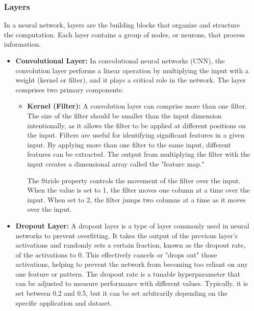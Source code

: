 \subsubsection{Layers}
In a neural network, layers are the building blocks that organize and structure the computation. Each layer contains a group of nodes, or neurons, that process information.
\begin{itemize}
    \item \textbf{Convolutional Layer: } In convolutional neural networks (CNN), the convolution layer performs a linear operation by multiplying the input with a weight (kernel or filter), and it plays a critical role in the network. The layer comprises two primary components: \\
    \begin{itemize}
        \item \textbf{Kernel (Filter): } A convolution layer can comprise more than one filter. The size of the filter should be smaller than the input dimension intentionally, as it allows the filter to be applied at different positions on the input. Filters are useful for identifying significant features in a given input. By applying more than one filter to the same input, different features can be extracted. The output from multiplying the filter with the input creates a dimensional array called the "feature map."

        The Stride property controls the movement of the filter over the input. When the value is set to 1, the filter moves one column at a time over the input. When set to 2, the filter jumps two columns at a time as it moves over the input.
    \end{itemize}
    \item \textbf{Dropout Layer: } A dropout layer is a type of layer commonly used in neural networks to prevent overfitting. It takes the output of the previous layer's activations and randomly sets a certain fraction, known as the dropout rate, of the activations to 0. This effectively cancels or "drops out" those activations, helping to prevent the network from becoming too reliant on any one feature or pattern. The dropout rate is a tunable hyperparameter that can be adjusted to measure performance with different values. Typically, it is set between 0.2 and 0.5, but it can be set arbitrarily depending on the specific application and dataset.
    

\end{itemize}
